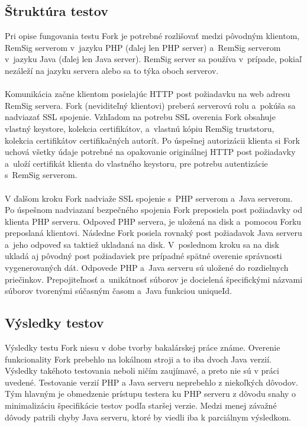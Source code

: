 \documentclass[
  digital, %
  table,   %
oneside,
  nolof,     %
  nolot,     %
]{fithesis3}
\begin{document}
\subsection{Štruktúra testov}
Pri opise fungovania testu Fork je potrebné rozlišovať medzi pôvodným klientom, RemSig serverom v~jazyku PHP (ďalej len PHP server) a~RemSig serverom v~jazyku Java (ďalej len Java server). RemSig server sa používa v~prípade, pokiaľ nezáleží na jazyku servera alebo sa to týka oboch serverov. \paragraph{} 
Komunikácia začne klientom posielajúc HTTP post požiadavku na web adresu RemSig servera. Fork (neviditeľný klientovi) preberá serverovú rolu a~pokúša sa nadviazať SSL spojenie. Vzhľadom na potrebu SSL overenia Fork  obsahuje vlastný keystore, kolekcia certifikátov, a~vlastnú kópiu RemSig truststoru, kolekcia certifikátov certifikačných autorít. Po úspešnej autorizácii klienta si Fork uchová všetky údaje potrebné na opakovanie originálnej HTTP post požiadavky a~uloží certifikát klienta do vlastného keystoru, pre potrebu autentizácie s~RemSig serverom. \paragraph{}
V ďalšom kroku Fork nadviaže SSL spojenie s~PHP serverom a~Java serverom. Po úspešnom nadviazaní bezpečného spojenia Fork preposiela post požiadavky od klienta PHP serveru. Odpoveď PHP servera, je uložená na disk a~pomocou Forku preposlaná klientovi. Následne Fork posiela rovnaký post požiadavok Java serveru a~jeho odpoveď sa taktiež ukladaná na disk. V~poslednom kroku sa na disk ukladá aj pôvodný post požiadaviek pre prípadné spätné overenie správnosti vygenerovaných dát.
Odpovede PHP a~Java serveru sú uložené do rozdielnych priečinkov. Prepojiteľnosť a~unikátnosť  súborov je docielená špecifickými názvami súborov tvorenými súčasným časom a~Java funkciou  uniqueId. 
\subsection{Výsledky testov}
Výsledky testu Fork niesu v dobe tvorby bakalárskej práce známe. Overenie funkcionality Fork prebehlo na lokálnom stroji a to iba dvoch Java verzií. Výsledky takéhoto testovania neboli ničím zaujímavé, a preto nie sú v práci uvedené. Testovanie verzií PHP a Java serveru neprebehlo z niekoľkých dôvodov. Tým hlavným je obmedzenie prístupu testera ku PHP serveru z dôvodu snahy o minimalizáciu špecifikácie testov podľa staršej verzie. Medzi menej závažné dôvody patrili chyby Java serveru, ktoré by viedli iba k parciálnym výsledkom.
\end{document}
